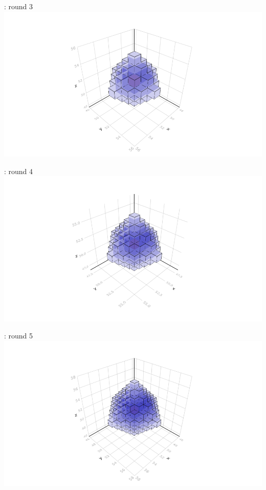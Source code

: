 \documentclass{beamer}
\begin{document}
\begin{frame}{\insertsubsection : round 3}
  \includegraphics[trim=5cm 0.7cm 5cm 3cm, clip, width=1\linewidth]{algorithm_visualisation/srgsteps/srgstep2.png}\\
\end{frame}
\begin{frame}{\insertsubsection : round 4}
  \includegraphics[trim=5cm 0.7cm 5cm 3cm, clip, width=1\linewidth]{algorithm_visualisation/srgsteps/srgstep3.png}\\
\end{frame}
\begin{frame}{\insertsubsection : round 5}
  \includegraphics[trim=5cm 0.7cm 5cm 3cm, clip, width=1\linewidth]{algorithm_visualisation/srgsteps/srgstep4.png}\\
\end{frame}
\end{document}
